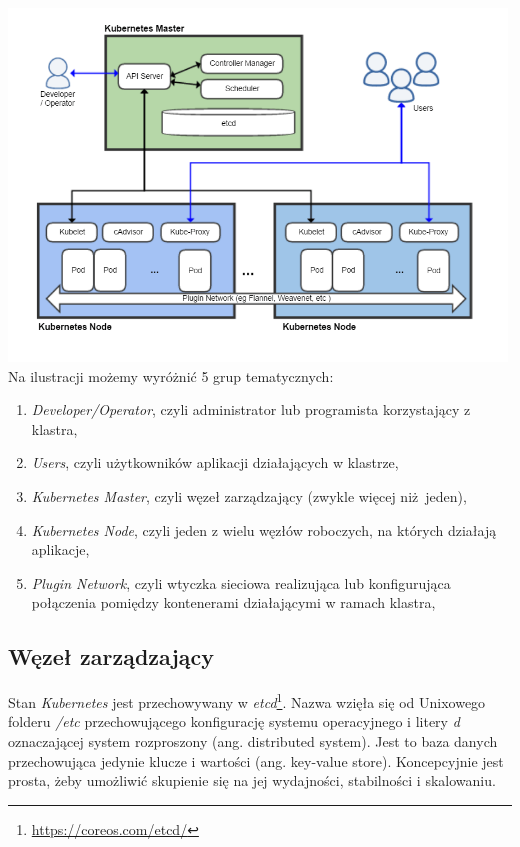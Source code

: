 \documentclass[a4paper,12pt,twoside,openany]{report}
\providecommand{\tightlist}{%
  \setlength{\itemsep}{0pt}\setlength{\parskip}{0pt}}
\DeclareRobustCommand{\href}[2]{#2\footnote{\url{#1}}}
\begin{document}
\includegraphics[width=5.20833in,height=3.6875in]{assets/kubernetes-architecture.png}\\

Na ilustracji możemy wyróżnić 5 grup tematycznych:

\begin{enumerate}
\def\labelenumi{\arabic{enumi}.}
\tightlist
\item
  \emph{Developer/Operator}, czyli administrator lub programista
  korzystający z klastra,
\item
  \emph{Users}, czyli użytkowników aplikacji działających w klastrze,
\item
  \emph{Kubernetes Master}, czyli węzeł zarządzający (zwykle więcej
  niż~jeden),
\item
  \emph{Kubernetes Node}, czyli jeden z wielu węzłów roboczych, na
  których działają aplikacje,
\item
  \emph{Plugin Network}, czyli wtyczka sieciowa realizująca lub
  konfigurująca połączenia pomiędzy kontenerami działającymi w ramach
  klastra,
\end{enumerate}

\hypertarget{wux119zeux142-zarzux105dzajux105cy}{%
\subsection{Węzeł
zarządzający}\label{wux119zeux142-zarzux105dzajux105cy}}

Stan \emph{Kubernetes} jest przechowywany w
\href{https://coreos.com/etcd/}{\emph{etcd}}. Nazwa wzięła się od
Unixowego folderu \emph{/etc} przechowującego konfigurację systemu
operacyjnego i litery \emph{d} oznaczającej system rozproszony (ang.
distributed system). Jest to baza danych przechowująca jedynie klucze i
wartości (ang. key-value store). Koncepcyjnie jest prosta, żeby
umożliwić skupienie się na jej wydajności, stabilności i skalowaniu.
\end{document}
